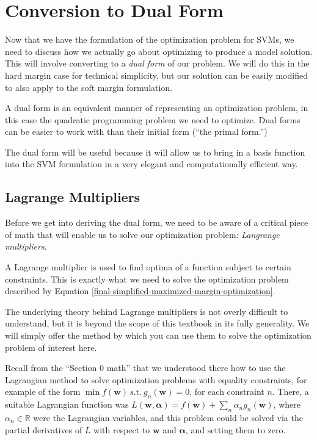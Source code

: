 \section{Conversion to Dual Form}

Now that we have the formulation of the optimization problem for SVMs, we need to discuss how we actually go about optimizing to produce a model solution. This will involve converting to a \textit{dual form} of our problem. We will do this in the hard margin case for technical simplicity, but our solution can be easily modified to also  apply to the soft margin formulation.

\begin{warning}
    A dual form is an equivalent manner of representing an optimization problem, in this case the quadratic programming problem we need to optimize. Dual forms can be easier to work with than their initial form (``the primal form.'')
\end{warning}

The dual form will be useful because it will allow us to bring in a basis function into the SVM formulation in a very elegant
and computationally efficient way.

\subsection{Lagrange Multipliers}

Before we get into deriving the dual form, we need to be aware of a critical piece of math that will enable us to solve our optimization problem: \textit{Langrange multipliers}.

A Lagrange multiplier is used to find optima of a function subject to certain constraints. This is exactly what we need to solve the optimization problem described by Equation \ref{final-simplified-maximized-margin-optimization}.

The underlying theory behind Lagrange multipliers is not overly difficult to understand, but it is beyond the scope of this textbook
in its fully generality. We will simply offer the method by which you can use them to solve
the optimization problem of interest here.

Recall from the ``Section 0 math'' that we understood there how to use the  Lagrangian method  to solve optimization problems with equality constraints, for example of the form $\min f(\mathbf{w}) \ \mbox{s.t.}\ g_n(\mathbf{w})=0$, for each constraint $n$. There, a suitable Lagrangian function was $L({\mathbf w},\boldsymbol{\alpha})=f({\mathbf w})+\sum_n\alpha_n g_n(\mathbf{w})$, where $\alpha_n\in\mathbb{R}$ were the Lagrangian variables,
and this problem
could be solved via the partial derivatives of $L$ with respect to ${\mathbf w}$ and $\boldsymbol{\alpha}$, and setting them to zero.
\medskip


